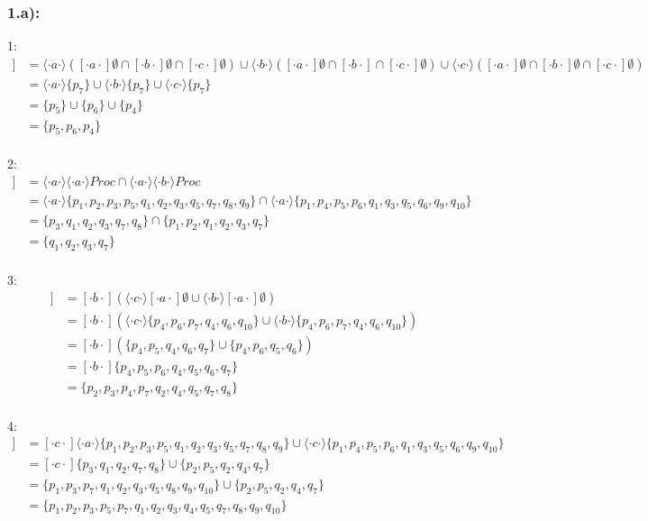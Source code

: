 \documentclass[10pt,a4paper,german,landscape,fleqn]{article} \usepackage[utf8]{inputenc} %
\newcommand{\ausws}[1]{ \langle \cdot #1 \cdot \rangle }
\newcommand{\auswl}[1]{ [ \cdot #1 \cdot ] }
\newcommand{\auswf}[1]{[\![ #1 ]\!]}
\begin{document}
\subsubsection*{1.a):}
1:
\begin{align*}
\auswf{F_1} &= \ausws{a} ( \auswl{a} \emptyset \cap \auswl{b} \emptyset \cap \auswl{c} \emptyset ) \cup \ausws{b} (\auswl{a} \emptyset \cap \auswl{b} \cap \auswl{c} \emptyset ) \cup \ausws{c}( \auswl{a} \emptyset \cap \auswl{b} \emptyset \cap \auswl{c} \emptyset )\\
&= \ausws{a} \{p_7\} \cup \ausws{b} \{p_7\} \cup \ausws{c} \{p_7\} \\
&= \{p_5\} \cup \{p_6\} \cup \{p_4\}  \\
&= \{ p_5, p_6, p_4 \}
\end{align*}
\\
2:
\begin{align*}
\auswf{F_2} &= \ausws{a} \ausws{a} Proc \cap \ausws{a} \ausws{b} Proc \\
&= \ausws{a} \{p_1,p_2,p_3,p_5,q_1,q_2,q_3,q_5,q_7,q_8,q_9 \} \cap \ausws{a} \{p_1,p_4,p_5,p_6,q_1,q_3,q_5,q_6,q_9,q_10 \} \\
&= \{p_3,q_1,q_2,q_3,q_7,q_8\} \cap \{p_1,p_2,q_1,q_2,q_3,q_7\} \\
&= \{q_1,q_2,q_3,q_7 \}
\end{align*}
\\
3:
\begin{align*}
\auswf{F_3} &= \auswl{b}( \ausws{c} \auswl{a} \emptyset \cup \ausws{b} \auswl{a} \emptyset) \\
&= \auswl{b}(\ausws{c}\{p_4,p_6,p_7,q_4,q_6,q_10\} \cup \ausws{b} \{p_4,p_6,p_7,q_4,q_6,q_10 \} ) \\
&= \auswl{b}( \{p_4,p_5,q_4,q_6,q_7\} \cup \{p_4,p_6,q_5,q_6\}) \\
&= \auswl{b} \{p_4,p_5,p_6,q_4,q_5,q_6,q_7 \} \\
&= \{p_2,p_3,p_4,p_7,q_2,q_4,q_5,q_7,q_8\}
\end{align*}
\\
4:
\begin{align*}
\auswf{F_4} &= \auswl{c} \ausws{a} \{p_1,p_2,p_3,p_5,q_1,q_2,q_3,q_5,q_7,q_8,q_9 \} \cup \ausws{c} \{p_1,p_4,p_5,p_6,q_1,q_3,q_5,q_6,q_9,q_10 \}  \\
&= \auswl{c} \{p_3,q_1,q_2,q_7,q_8\} \cup \{p_2,p_5,q_2,q_4,q_7 \} \\
&= \{p_1,p_3,p_7,q_1,q_2,q_3,q_5,q_8,q_9,q_10\} \cup \{p_2,p_5,q_2,q_4,q_7 \} \\
&= \{p_1,p_2,p_3,p_5,p_7,q_1,q_2,q_3,q_4,q_5,q_7,q_8,q_9,q_{10}\}
\end{align*}
\newpage
\end{document}
